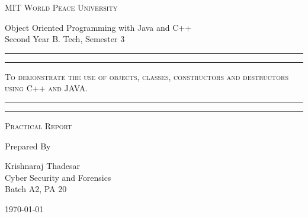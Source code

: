 \documentclass[11pt]{article}
\begin{document}
	
	\begin{titlepage} 
		\centering 
		
		
		\huge\textsc{
			MIT World Peace University
		}\\
	
		\vspace{0.75\baselineskip} %
		
		\LARGE{
			Object Oriented Programming with Java and C++\\
			Second Year B. Tech, Semester 3
		}
		
		\vfill %
		
		
		\rule{\textwidth}{1.6pt}\vspace*{-\baselineskip}\vspace*{2pt}
		\rule{\textwidth}{0.6pt}
		\vspace{0.75\baselineskip} %
		
		
		
		\huge{\textsc{
			To demonstrate the use of objects, classes, constructors and destructors using C++ and JAVA.
			}} \\
		
		
		
		\vspace{0.5\baselineskip} %
		\rule{\textwidth}{0.6pt}\vspace*{-\baselineskip}\vspace*{2.8pt}
		\rule{\textwidth}{1.6pt}
		
		\vspace{1\baselineskip} %

			
		\LARGE\textsc{
			Practical Report
		} %
		\vfill
		
		
		Prepared By
		\vspace{0.5\baselineskip} %
		
		\Large{
			Krishnaraj Thadesar \\
			Cyber Security and Forensics\\
			Batch A2, PA 20
		}
		
		
		\vspace{0.5\baselineskip} %
		\today

	\end{titlepage}
	
\end{document}
